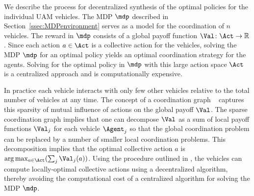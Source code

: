 \label{sec:Decent_synth}

We describe the process for decentralized synthesis of the optimal policies for the individual UAM vehicles. %
The MDP $\mdp$ described in Section~\ref{ssec:MDPenvironment} serves as a model for the coordination of $n$ vehicles. %
The reward in $\mdp$ consists of a global payoff function $\Val \colon \Act \rightarrow \mathbb{R}$. %
Since each action $a \in \Act$ is a collective action for the vehicles, solving the MDP $\mdp$ for an optimal policy yields an optimal coordination strategy for the agents. %
Solving for the optimal policy in  $\mdp$ with this large action space $\Act$ is a centralized approach and is computationally expensive.

In practice each vehicle interacts with only few other vehicles relative to the total number of vehicles at any time. %
The concept of a coordination graph ~\cite{guestrin2002multiagent} captures this sparsity of mutual influence of actions on the global payoff $\Val$. %
The sparse coordination graph implies that one can decompose $\Val$ as a sum of local payoff functions $\Val_j$ for each vehicle $\Agent_j$ so that the global coordination problem can be replaced by a number of smaller local coordination problems. %
This decomposition implies that the optimal collective action $a$ is $\arg \max_{a \in \Act}(\sum_j \Val_j(a))$. 
Using the procedure outlined in \cite{guestrin2002multiagent}, the vehicles can compute locally-optimal collective actions using a decentralized algorithm, thereby avoiding the computational cost of a centralized algorithm for solving the MDP $\mdp$. %




